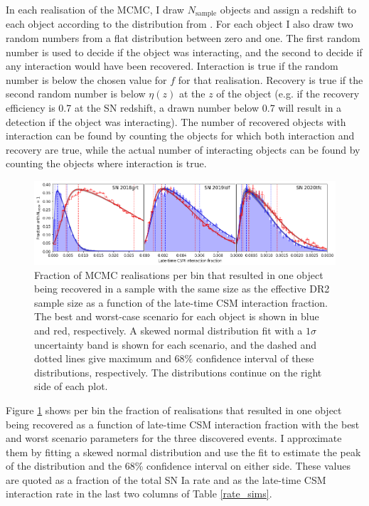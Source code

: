\documentclass[a4paper,oneside,12pt, class=Latex/Classes/PhDthesisPSnPDF, crop=false]{standalone}
\begin{document}
In each realisation of the MCMC, I draw $N_\text{sample}$ objects and assign a redshift to each object according to the distribution from \citet{SNIa_rate}. For each object I also draw two random numbers from a flat distribution between zero and one. The first random number is used to decide if the object was interacting, and the second to decide if any interaction would have been recovered. Interaction is true if the random number is below the chosen value for $f$ for that realisation. Recovery is true if the second random number is below $\eta(z)$ at the $z$ of the object (e.g. if the recovery efficiency is 0.7 at the SN redshift, a drawn number below 0.7 will result in a detection if the object was interacting). The number of recovered objects with interaction can be found by counting the objects for which both interaction and recovery are true, while the actual number of interacting objects can be found by counting the objects where interaction is true.

\begin{figure}
 \centering
 \includegraphics[width=\textwidth]{../Images/chapter_3/rateplots.png}
 \caption{Fraction of MCMC realisations per bin that resulted in one object being recovered in a sample with the same size as the effective DR2 sample size as a function of the late-time CSM interaction fraction. The best and worst-case scenario for each object is shown in blue and red, respectively. A skewed normal distribution fit with a $1 \sigma$ uncertainty band is shown for each scenario, and the dashed and dotted lines give maximum and 68\% confidence interval of these distributions, respectively. The distributions continue on the right side of each plot.}
 \label{rate_fig}
\end{figure}

Figure \ref{rate_fig} shows per bin the fraction of realisations that resulted in one object being recovered as a function of late-time CSM interaction fraction with the best and worst scenario parameters for the three discovered events. I approximate them by fitting a skewed normal distribution and use the fit to estimate the peak of the distribution and the 68\% confidence interval on either side. These values are quoted as a fraction of the total SN Ia rate and as the late-time CSM interaction rate in the last two columns of Table \ref{rate_sims}.
\end{document}
